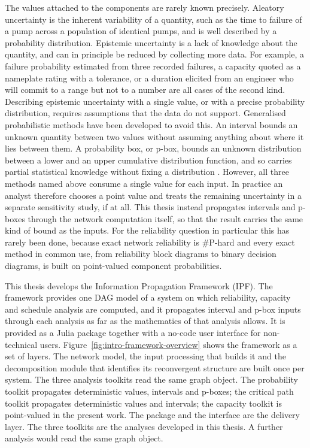 \documentclass[12pt]{report}
\begin{document}
The values attached to the components are rarely known precisely. Aleatory uncertainty is the inherent variability of a quantity, such as
the time to failure of a pump across a population of identical pumps, and is well described by a
probability distribution. Epistemic uncertainty is a lack of knowledge about the quantity, and
can in principle be reduced by collecting more data. For example, a failure probability estimated from three recorded failures, a capacity quoted
as a nameplate rating with a tolerance, or a duration elicited from an engineer who will commit
to a range but not to a number are all cases of the second kind. Describing epistemic uncertainty with a single value, or with a precise
probability distribution, requires assumptions that the data do not support. Generalised
probabilistic methods have been developed to avoid this. An interval bounds an unknown quantity
between two values without assuming anything about where it lies between them. A probability
box, or p-box, bounds an unknown distribution between a lower and an upper cumulative
distribution function, and so carries partial statistical knowledge without fixing a
distribution \cite{ferson2003constructing,williamson1990probabilistic}. However, all three methods named above consume a single value for each input. In practice an
analyst therefore chooses a point value and treats the remaining uncertainty in a separate
sensitivity study, if at all.
This thesis instead propagates intervals and p-boxes through the network computation
itself, so that the result carries the same kind of bound as the inputs. For the reliability
question in particular this has rarely been done, because exact network reliability
is \#P-hard \cite{valiant1979complexity,ball1986computational} and every exact method in
common use, from reliability block diagrams to binary decision diagrams, is built on
point-valued component probabilities.

This thesis develops the Information Propagation Framework (IPF). The framework provides one
DAG model of a system on which reliability, capacity and schedule analysis are computed, and it
propagates interval and p-box inputs through each analysis as far as the mathematics of that
analysis allows. It is provided as a Julia package together with a no-code user interface for
non-technical users. Figure~\ref{fig:intro-framework-overview} shows the framework as a set of
layers. The network model, the input processing that builds it and the decomposition module
that identifies its reconvergent structure are built once per system. The three analysis
toolkits read the same graph object. The probability toolkit propagates deterministic values,
intervals and p-boxes; the critical path toolkit propagates deterministic values and
intervals; the capacity toolkit is point-valued in the present work. The package and the
interface are the delivery layer. The three toolkits are the analyses developed in this thesis. A further analysis would read
the same graph object.
\end{document}
